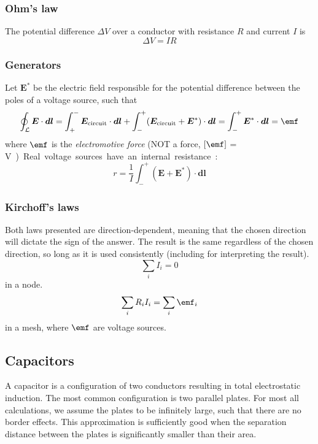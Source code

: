 \documentclass[a4paper, 12pt]{article}
\renewcommand{\vec}[1]{\bm{#1}}
\newcommand{\E}{\ensuremath{\vec{E}}}
\begin{document}
    \subsubsection{Ohm's law}
        The potential difference $\Delta V$ over a conductor with resistance $R$ and current $I$ is
        \begin{equation}
            \Delta V = IR
        \end{equation}
        
    \subsubsection{Generators}
        Let $\E^*$ be the electric field responsible for the potential difference between the poles of a voltage source, such that
        \begin{equation}
            \oint_\mathcal{L} \E\cdot \vec{dl} = \int_+^-\E_{\text{circuit}}\cdot \vec{dl} + \int_-^+(\E_{\text{circuit}} + \E^*)\cdot \vec{dl} = \int_-^+\E^*\cdot \vec{dl} = \emf
        \end{equation}
        where $\emf$ is the \textit{electromotive force} (NOT a force, $\left[\emf\right]$ = \si\volt)
        
        Real voltage sources have an internal resistance:
        \begin{equation}
            r = \frac{1}{I}\int_-^+(\E + \E^*)\cdot\vec{dl}
        \end{equation}
        
    \subsubsection{Kirchoff's laws}
        Both laws presented are direction-dependent, meaning that the chosen direction will dictate the sign of the answer. 
        The result is the same regardless of the chosen direction, so long as it is used consistently (including for interpreting the result).
        \begin{equation}
            \sum_i I_i = 0
        \end{equation}
        in a node.
        \begin{equation}
            \sum_i R_iI_i = \sum_i \emf_i
        \end{equation}
        in a mesh, where $\emf$ are voltage sources. 

    \subsection{Capacitors}
    A capacitor is a configuration of two conductors resulting in total electrostatic induction. 
    The most common configuration is  two parallel plates.
    For most all calculations, we assume the plates to be infinitely large, such that there are no border effects. 
    This approximation is sufficiently good when the separation distance between the plates is significantly smaller than their area.
    
\end{document}
